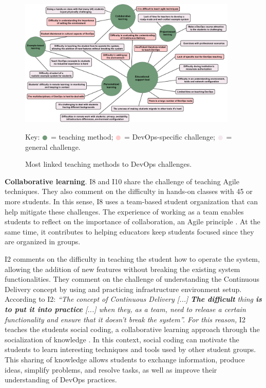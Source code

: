 \documentclass[10pt,conference]{IEEEtran}
\begin{document}
\begin{figure}[ht]
 \centering
  \includegraphics[width=0.93\textwidth]{fig/mostLinkedTeachingMethods.pdf}
   \caption{Most linked teaching methods to DevOps challenges.}
   Key: $\textcolor{teachingMethods}{\CIRCLE}$ = teaching method; $\textcolor{devopsSpecificChallenges}{\CIRCLE}$ = DevOps-specific challenge; $\textcolor{generalChallenges}{\CIRCLE}$ = general challenge. 
  \label{fig:mostLinkedTeachingMethods}
\end{figure}     



{\textbf{Collaborative learning}.} I8 and I10 share the challenge of teaching Agile techniques. They also comment on the difficulty in hands-on classes with 45 or more students. In this sense, I8 uses a team-based student organization that can help mitigate these challenges. The experience of working as a team enables students to reflect on the importance of collaboration, an Agile principle \cite{diebold:2014}. At the same time, it contributes to helping educators keep students focused since they are organized in groups.


I2 comments on the difficulty in teaching the student how to operate the system, allowing the addition of new features without breaking the existing system functionalities. They comment on the challenge of understanding the Continuous Delivery concept by using and practicing infrastructure environment setup. According to I2: \textit{``The concept of Continuous Delivery [...] \textbf{The difficult} thing \textbf{is to put it into practice} [...] when they, as a team, need to release a certain functionality and ensure that it doesn't break the system''. For this reason,} I2 teaches the students social coding, a collaborative learning approach through the socialization of knowledge \cite{dabbish:2012}. In this context, social coding can motivate the students to learn interesting techniques and tools used by other student groups. This sharing of knowledge allows students to exchange information, produce ideas, simplify problems, and resolve tasks, as well as improve their understanding of DevOps practices.
\end{document}
